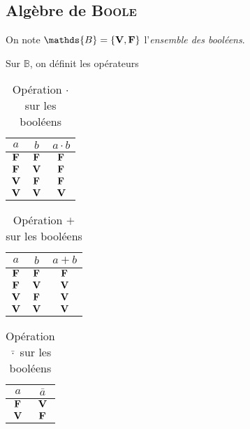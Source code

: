 \subsection{Algèbre de {\scshape Boole}}

\begin{defn}
	On note $\mathds{B} = \{{\bfm V},{\bfm F}\}$\/ l'{\it ensemble des booléens}.
\end{defn}

\begin{defn}
	Sur $\mathds{B}$, on définit les opérateurs
	\begin{table}[H]
		\centering
		\begin{tabular}{c|c|c}
			$a$\/ & $b$\/ &$a\cdot b$\/ \\ \hline
			${\mathbf{F}}\/$\/&${\mathbf{F}}\/$\/&${\mathbf{F}}\/$\/\\
			${\mathbf{F}}\/$\/&${\mathbf{V}}\/$\/&${\mathbf{F}}\/$\/\\
			${\mathbf{V}}\/$\/&${\mathbf{F}}\/$\/&${\mathbf{F}}\/$\/\\
			${\mathbf{V}}\/$\/&${\mathbf{V}}\/$\/&${\mathbf{V}}\/$\/\\
		\end{tabular}
		\caption{Opération $\cdot $\/ sur les booléens}
	\end{table}

	\begin{table}[H]
		\centering
		\begin{tabular}{c|c|c}
			$a$\/ & $b$\/ &$a+b$\/ \\ \hline
			${\mathbf{F}}\/$\/&${\mathbf{F}}\/$\/&${\mathbf{F}}\/$\/\\
			${\mathbf{F}}\/$\/&${\mathbf{V}}\/$\/&${\mathbf{V}}\/$\/\\
			${\mathbf{V}}\/$\/&${\mathbf{F}}\/$\/&${\mathbf{V}}\/$\/\\
			${\mathbf{V}}\/$\/&${\mathbf{V}}\/$\/&${\mathbf{V}}\/$\/\\
		\end{tabular}
		\caption{Opération $+$\/ sur les booléens}
	\end{table}

	\begin{table}[H]
		\centering
		\begin{tabular}{c|c}
			$a$\/ &$\bar{a}$\/ \\ \hline
			${\mathbf{F}}\/$\/&${\mathbf{V}}\/$\/\\
			${\mathbf{V}}\/$\/&${\mathbf{F}}\/$\/\\
		\end{tabular}
		\caption{Opération $\bar{\cdot}$\/ sur les booléens}
	\end{table}
\end{defn}

